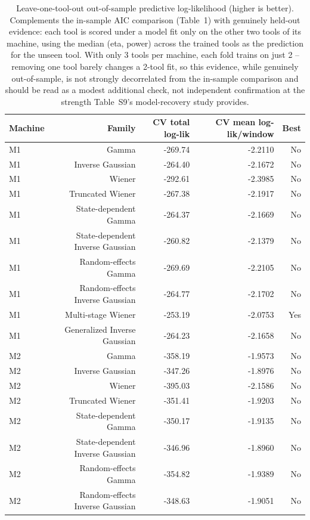 \begin{table}[t]
\centering
\caption{Leave-one-tool-out out-of-sample predictive log-likelihood (higher is better). Complements the in-sample AIC comparison (Table~1) with genuinely held-out evidence: each tool is scored under a model fit only on the other two tools of its machine, using the median (eta, power) across the trained tools as the prediction for the unseen tool. With only 3 tools per machine, each fold trains on just 2 -- removing one tool barely changes a 2-tool fit, so this evidence, while genuinely out-of-sample, is not strongly decorrelated from the in-sample comparison and should be read as a modest additional check, not independent confirmation at the strength Table~S9's model-recovery study provides.}
\label{tab:cv-likelihood}
\begin{tabular}{lrrrr}
\toprule
Machine & Family & CV total log-lik & CV mean log-lik/window & Best \\
\midrule
M1 & Gamma & -269.74 & -2.2110 & No \\
M1 & Inverse Gaussian & -264.40 & -2.1672 & No \\
M1 & Wiener & -292.61 & -2.3985 & No \\
M1 & Truncated Wiener & -267.38 & -2.1917 & No \\
M1 & State-dependent Gamma & -264.37 & -2.1669 & No \\
M1 & State-dependent Inverse Gaussian & -260.82 & -2.1379 & No \\
M1 & Random-effects Gamma & -269.69 & -2.2105 & No \\
M1 & Random-effects Inverse Gaussian & -264.77 & -2.1702 & No \\
M1 & Multi-stage Wiener & -253.19 & -2.0753 & Yes \\
M1 & Generalized Inverse Gaussian & -264.23 & -2.1658 & No \\
M2 & Gamma & -358.19 & -1.9573 & No \\
M2 & Inverse Gaussian & -347.26 & -1.8976 & No \\
M2 & Wiener & -395.03 & -2.1586 & No \\
M2 & Truncated Wiener & -351.41 & -1.9203 & No \\
M2 & State-dependent Gamma & -350.17 & -1.9135 & No \\
M2 & State-dependent Inverse Gaussian & -346.96 & -1.8960 & No \\
M2 & Random-effects Gamma & -354.82 & -1.9389 & No \\
M2 & Random-effects Inverse Gaussian & -348.63 & -1.9051 & No \\

\end{tabular}
\end{table}
